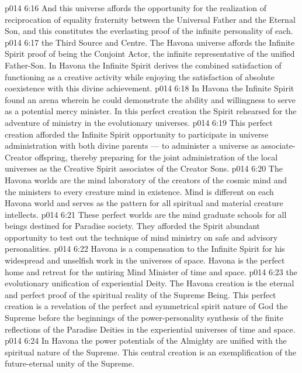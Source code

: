 \vs p014 6:16 And this universe affords the opportunity for the realization of reciprocation of equality fraternity between the Universal Father and the Eternal Son, and this constitutes the everlasting proof of the infinite personality of each.
\vs p014 6:17 \bibnobreakspace {} the Third Source and Centre. The Havona universe affords the Infinite Spirit proof of being the Conjoint Actor, the infinite representative of the unified Father\hyp{}Son. In Havona the Infinite Spirit derives the combined satisfaction of functioning as a creative activity while enjoying the satisfaction of absolute coexistence with this divine achievement.
\vs p014 6:18 In Havona the Infinite Spirit found an arena wherein he could demonstrate the ability and willingness to serve as a potential mercy minister. In this perfect creation the Spirit rehearsed for the adventure of ministry in the evolutionary universes.
\vs p014 6:19 This perfect creation afforded the Infinite Spirit opportunity to participate in universe administration with both divine parents --- to administer a universe as associate\hyp{}Creator offspring, thereby preparing for the joint administration of the local universes as the Creative Spirit associates of the Creator Sons.
\vs p014 6:20 The Havona worlds are the mind laboratory of the creators of the cosmic mind and the ministers to every creature mind in existence. Mind is different on each Havona world and serves as the pattern for all spiritual and material creature intellects.
\vs p014 6:21 These perfect worlds are the mind graduate schools for all beings destined for Paradise society. They afforded the Spirit abundant opportunity to test out the technique of mind ministry on safe and advisory personalities.
\vs p014 6:22 Havona is a compensation to the Infinite Spirit for his widespread and unselfish work in the universes of space. Havona is the perfect home and retreat for the untiring Mind Minister of time and space.
\vs p014 6:23 \bibnobreakspace {} the evolutionary unification of experiential Deity. The Havona creation is the eternal and perfect proof of the spiritual reality of the Supreme Being. This perfect creation is a revelation of the perfect and symmetrical spirit nature of God the Supreme before the beginnings of the power\hyp{}personality synthesis of the finite reflections of the Paradise Deities in the experiential universes of time and space.
\vs p014 6:24 In Havona the power potentials of the Almighty are unified with the spiritual nature of the Supreme. This central creation is an exemplification of the future\hyp{}eternal unity of the Supreme.
